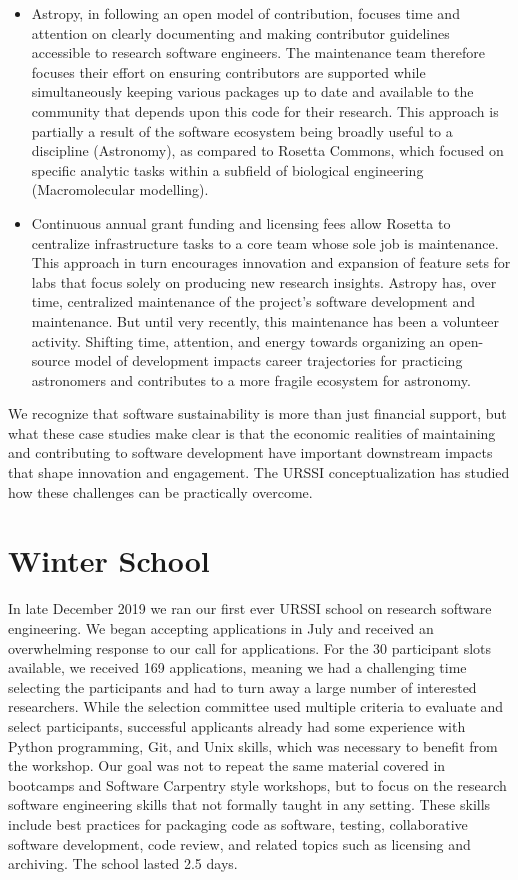 \documentclass[
]{book}
\begin{document}
\begin{itemize}
\item
  Astropy, in following an open model of contribution, focuses time and
  attention on clearly documenting and making contributor guidelines
  accessible to research software engineers. The maintenance team
  therefore focuses their effort on ensuring contributors are supported
  while simultaneously keeping various packages up to date and available
  to the community that depends upon this code for their research. This approach is
  partially a result of the software ecosystem being broadly useful to a
  discipline (Astronomy), as compared to Rosetta Commons, which focused on
  specific analytic tasks within a subfield of biological engineering
  (Macromolecular modelling).
\item
  Continuous annual grant funding and licensing fees allow Rosetta to
  centralize infrastructure tasks to a core team whose sole job is
  maintenance. This approach in turn encourages innovation and expansion of feature
  sets for labs that focus solely on producing new research insights.
  Astropy has, over time, centralized maintenance of the project's software
  development and maintenance. But until very recently, this maintenance has been a
  volunteer activity. Shifting time, attention, and energy towards organizing
  an open-source model of development impacts career trajectories for
  practicing astronomers and contributes to a more fragile ecosystem for astronomy.
\end{itemize}

We recognize that software sustainability is more than just financial support,
but what these case studies make clear is that the economic realities of
maintaining and contributing to software development have important downstream
impacts that shape innovation and engagement. The URSSI conceptualization
has studied how these challenges can be practically overcome.

\hypertarget{chapter2-WinterSchool}{%
\section{Winter School}\label{chapter2-WinterSchool}}

In late December 2019 we ran our
first ever URSSI school on research software engineering. We began accepting
applications in July and received an overwhelming response to our call for
applications. For the 30 participant slots available, we received 169
applications, meaning we had a challenging time selecting the participants
and had to turn away a large number of interested researchers. While the
selection committee used multiple criteria to evaluate and select participants,
successful applicants already had some experience with Python programming, Git,
and Unix skills, which was necessary to benefit from the workshop. Our goal
was not to repeat the same material covered in bootcamps and Software Carpentry
style workshops, but to focus on the research software engineering skills that
not formally taught in any setting. These skills include best practices
for packaging code as software, testing, collaborative software development,
code review, and related topics such as licensing and archiving. The school
lasted 2.5 days.
\end{document}
